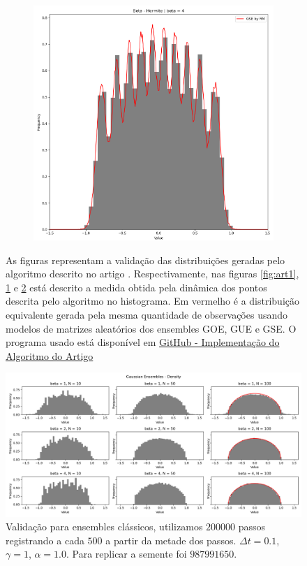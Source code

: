 \documentclass[12pt]{report}
\begin{document}
\begin{figure}
\begin{subfigure}{.5\textwidth}
		\caption{}
		\label{fig:art2}
	\end{subfigure}
	\begin{subfigure}{.5\textwidth}
		\centering
		\includegraphics[width=.9\linewidth]{Assets/b4WT}
		\caption{}
		\label{fig:art3}
	\end{subfigure}
	\caption{
		As figuras representam a validação das distribuições geradas pelo algoritmo descrito no artigo \cite{Chafa__2018}. Respectivamente, nas figuras \ref{fig:art1}, \ref{fig:art2} e \ref{fig:art3} está descrito a medida obtida pela dinâmica dos pontos descrita pelo algoritmo no histograma. Em vermelho é a distribuição equivalente gerada pela mesma quantidade de observações usando modelos de matrizes aleatórios dos ensembles GOE, GUE e GSE.  O programa usado está disponível em \href{https://github.com/Joao-vap/RMT-Code/tree/main/ArticleAlg}{GitHub - Implementação do Algoritmo do Artigo}}
	\label{fig:artigo}
\end{figure}


\begin{figure}
	\includegraphics[scale=0.45]{Assets/validationArticleAlg}
	\caption{Validação para ensembles clássicos, utilizamos $200000$ passos registrando a cada $500$ a partir da metade dos passos. $\Delta t = 0.1$, $\gamma = 1$, $\alpha = 1.0$. Para replicar a semente foi $987991650$.}
\end{figure}
\end{document}
